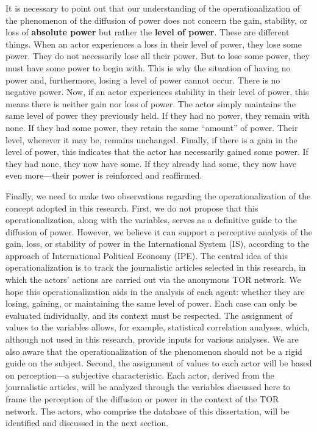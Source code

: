 It is necessary to point out that our understanding of the operationalization of the phenomenon of the diffusion of power does not concern the gain, stability, or loss of \textbf{absolute power} but rather the \textbf{level of power}. These are different things. When an actor experiences a loss in their level of power, they lose some power. They do not necessarily lose all their power. But to lose some power, they must have some power to begin with. This is why the situation of having no power and, furthermore, losing a level of power cannot occur. There is no negative power. Now, if an actor experiences stability in their level of power, this means there is neither gain nor loss of power. The actor simply maintains the same level of power they previously held. If they had no power, they remain with none. If they had some power, they retain the same ``amount'' of power. Their level, wherever it may be, remains unchanged. Finally, if there is a gain in the level of power, this indicates that the actor has necessarily gained some power. If they had none, they now have some. If they already had some, they now have even more---their power is reinforced and reaffirmed.

Finally, we need to make two observations regarding the operationalization of the concept adopted in this research. First, we do not propose that this operationalization, along with the variables, serves as a definitive guide to the diffusion of power. However, we believe it can support a perceptive analysis of the gain, loss, or stability of power in the International System (IS), according to the approach of International Political Economy (IPE). The central idea of this operationalization is to track the journalistic articles selected in this research, in which the actors' actions are carried out via the anonymous TOR network. We hope this operationalization aids in the analysis of each agent: whether they are losing, gaining, or maintaining the same level of power. Each case can only be evaluated individually, and its context must be respected. The assignment of values to the variables allows, for example, statistical correlation analyses, which, although not used in this research, provide inputs for various analyses. We are also aware that the operationalization of the phenomenon should not be a rigid guide on the subject. Second, the assignment of values to each actor will be based on perception---a subjective characteristic. Each actor, derived from the journalistic articles, will be analyzed through the variables discussed here to frame the perception of the diffusion or power in the context of the TOR network. The actors, who comprise the database of this dissertation, will be identified and discussed in the next section.

